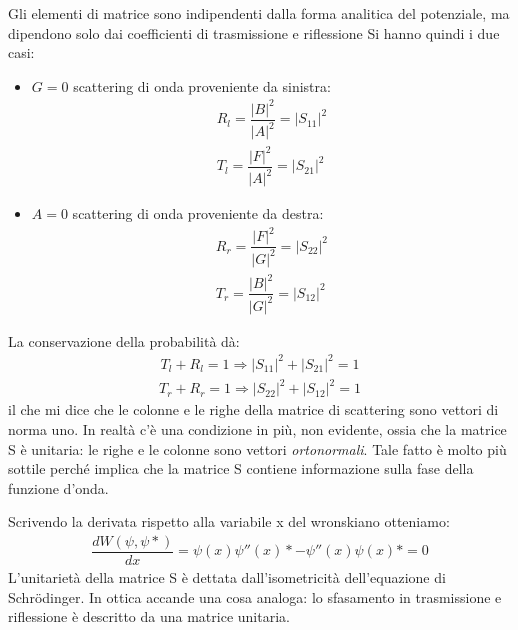 Gli elementi di matrice sono indipendenti dalla forma analitica del potenziale, ma dipendono solo dai coefficienti di trasmissione e riflessione
Si hanno quindi i due casi:
\begin{itemize}
\item $G=0$ scattering di onda proveniente da sinistra:
\begin{equation}\begin{split}
R_{l}=\dfrac{|B|^2}{|A|^2}=|S_{11}|^2 \\
T_{l}=\dfrac{|F|^2}{|A|^2}=|S_{21}|^2
\end{split}\end{equation}
\item $A=0$ scattering di onda proveniente da destra:
\begin{equation}\begin{split}
R_{r}=\dfrac{|F|^2}{|G|^2}=|S_{22}|^2 \\
T_{r}=\dfrac{|B|^2}{|G|^2}=|S_{12}|^2
\end{split}\end{equation}
\end{itemize}
La conservazione della probabilità dà:
\begin{equation}\begin{split}
T_l +R_l=1 \Longrightarrow |S_{11}|^2 +|S_{21}|^2=1
\end{split}\end{equation}
\begin{equation}\begin{split}
T_r +R_r=1 \Longrightarrow |S_{22}|^2+|S_{12}|^2=1
\end{split}\end{equation}
il che mi dice che le colonne e le righe della matrice di scattering sono vettori di norma uno. In realtà c'è una condizione in più, non evidente, ossia che la matrice S è unitaria: le righe e le colonne sono vettori \emph{ortonormali}. Tale fatto è molto più sottile perché implica che la matrice S contiene informazione sulla fase della funzione d'onda.

Scrivendo la derivata rispetto alla variabile x del wronskiano otteniamo:
\begin{equation}\begin{split}
\dfrac{dW(\psi,\psi *)}{dx}=\psi (x) \psi ''(x)*-\psi ''(x) \psi (x)*=0
\end{split}\end{equation}
L'unitarietà della matrice S è dettata dall'isometricità dell'equazione di Schrödinger.
In ottica accande una cosa analoga: lo sfasamento in trasmissione e riflessione è descritto da una matrice unitaria.

